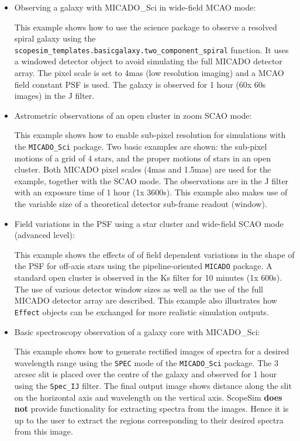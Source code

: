 \begin{itemize}
\item Observing a galaxy with MICADO\_Sci in wide-field MCAO mode:

This example shows how to use the science package to observe a resolved spiral galaxy using the \texttt{scopesim\_templates.basicgalaxy.two\_component\_spiral} function.
It uses a windowed detector object to avoid simulating the full MICADO detector array.
The pixel scale is set to 4mas (low resolution imaging) and a MCAO field constant PSF is used.
The galaxy is observed for 1 hour (60x 60s images) in the J filter.

\item Astrometric observations of an open cluster in zoom SCAO mode:

This example shows how to enable sub-pixel resolution for simulations with the \texttt{MICADO\_Sci} package.
Two basic examples are shown: the sub-pixel motions of a grid of 4 stars, and the proper motions of stars in an open cluster.
Both MICADO pixel scales (4mas and 1.5mas) are used for the example, together with the SCAO mode.
The observations are in the J filter with an exposure time of 1 hour (1x 3600s).
This example also makes use of the variable size of a theoretical detector sub-frame readout (window).

\item Field variations in the PSF using a star cluster and wide-field SCAO mode (advanced level):

This example shows the effects of of field dependent variations in the shape of the PSF for off-axis stars using the pipeline-oriented \texttt{MICADO} package.
A standard open cluster is observed in the Ks filter for 10 minutes (1x 600s).
The use of various detector window sizes as well as the use of the full MICADO detector array are described.
This example also illustrates how \texttt{Effect} objects can be exchanged for more realistic simulation outputs.

\item Basic spectroscopy observation of a galaxy core with MICADO\_Sci:

This example shows how to generate rectified images of spectra for a desired wavelength range using the \texttt{SPEC} mode of the \texttt{MICADO\_Sci} package.
The 3 arcsec slit is placed over the centre of the galaxy and observed for 1 hour using the \texttt{Spec\_IJ} filter.
The final output image shows distance along the slit on the horizontal axis and wavelength on the vertical axis.
ScopeSim \textbf{does not} provide functionality for extracting spectra from the images.
Hence it is up to the user to extract the regions corresponding to their desired spectra from this image.


\end{itemize}
